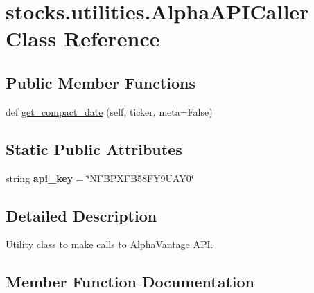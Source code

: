 \hypertarget{classstocks_1_1utilities_1_1_alpha_a_p_i_caller}{}\section{stocks.\+utilities.\+Alpha\+A\+P\+I\+Caller Class Reference}
\label{classstocks_1_1utilities_1_1_alpha_a_p_i_caller}
\subsection*{Public Member Functions}
\begin{DoxyCompactItemize}
\item 
def \mbox{\hyperlink{classstocks_1_1utilities_1_1_alpha_a_p_i_caller_afe8af95b88e6c6ae8c09a14bfe7f0d2e}{get\+\_\+compact\+\_\+date}} (self, ticker, meta=False)
\end{DoxyCompactItemize}
\subsection*{Static Public Attributes}
\begin{DoxyCompactItemize}
\item 
\mbox{\label{classstocks_1_1utilities_1_1_alpha_a_p_i_caller_aa11f142157a5775ee4ccf2c09e6be4fd}} 
string {\bfseries api\+\_\+key} = \char`\"{}N\+F\+B\+P\+X\+F\+B58\+F\+Y9\+U\+A\+Y0\char`\"{}
\end{DoxyCompactItemize}


\subsection{Detailed Description}
\begin{DoxyVerb}Utility class to make calls to AlphaVantage API.
\end{DoxyVerb}
 

\subsection{Member Function Documentation}
\mbox{\label{classstocks_1_1utilities_1_1_alpha_a_p_i_caller_afe8af95b88e6c6ae8c09a14bfe7f0d2e}} 
